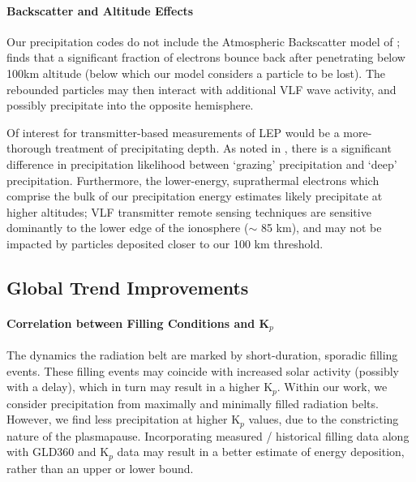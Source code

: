 \paragraph{Backscatter and Altitude Effects}
Our precipitation codes do not include the Atmospheric Backscatter model of \cite{Cotts2011}; \citeauthor{Cotts2011} finds that a significant fraction of electrons bounce back after penetrating below 100km altitude (below which our model considers a particle to be lost). The rebounded particles may then interact with additional VLF wave activity, and possibly precipitate into the opposite hemisphere.

Of interest for transmitter-based measurements of LEP would be a more-thorough treatment of precipitating depth. As noted in \cite{Cotts2011}, there is a significant difference in precipitation likelihood between `grazing' precipitation and `deep' precipitation. Furthermore, the lower-energy, suprathermal electrons which comprise the bulk of our precipitation energy estimates likely precipitate at higher altitudes; VLF transmitter remote sensing techniques are sensitive dominantly to the lower edge of the ionosphere ($\sim$ 85 km), and may not be impacted by particles deposited closer to our 100 km threshold.

\subsection{Global Trend Improvements}
\paragraph{Correlation between Filling Conditions and K$_p$}
The dynamics the radiation belt are marked by short-duration, sporadic filling events. These filling events may coincide with increased solar activity (possibly with a delay), which in turn may result in a higher K$_p$. Within our work, we consider precipitation from maximally and minimally filled radiation belts. However, we find less precipitation at higher K$_p$ values, due to the constricting nature of the plasmapause. Incorporating measured / historical filling data along with GLD360 and K$_p$ data may result in a better estimate of energy deposition, rather than an upper or lower bound.

